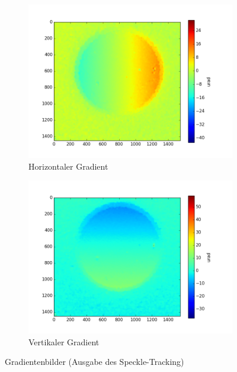 \begin{figure}[htbp]
	\centering
	\begin{subfigure}[b]{0.35\textwidth}
		\centering
		\includegraphics[width=\textwidth]{img/SpeckDisH_E10001_edf_ref_start0001_1-10_edf}
		\caption[Horizontaler Gradient]{Horizontaler Gradient}
		\label{fig:hor_grad}
	\end{subfigure}
	\begin{subfigure}[b]{0.35\textwidth}
		\centering
		\includegraphics[width=\textwidth]{img/SpeckDisV_E10001_edf_ref_start0001_1-10_edf}
		\caption[Vertikaler Gradient]{Vertikaler Gradient}
		\label{fig:vert_grad}
	\end{subfigure}
	\caption[Gradient]{Gradientenbilder (Ausgabe des Speckle-Tracking)}
	\label{fig:gradienten}
\end{figure}

